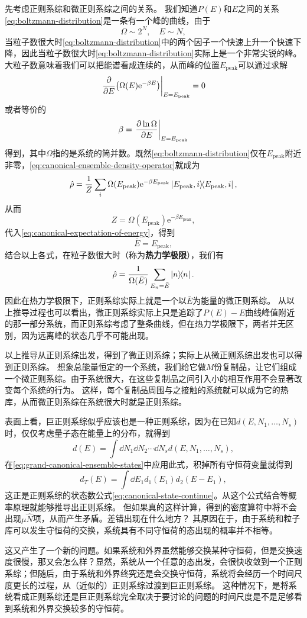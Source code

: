 \documentclass[hyperref, UTF8, a4paper]{ctexart}
\newcommand*{\ee}{\mathrm{e}}
\begin{document}
先考虑正则系综和微正则系综之间的关系。
我们知道$P(E)$和$E$之间的关系\eqref{eq:boltzmann-distribution}是一条有一个峰的曲线，由于
\[
    \Omega \sim 2^N, \quad E \sim N,
\]
当粒子数很大时\eqref{eq:boltzmann-distribution}中的两个因子一个快速上升一个快速下降，因此当粒子数很大时\eqref{eq:boltzmann-distribution}实际上是一个非常尖锐的峰。
大粒子数意味着我们可以把能谱看成连续的，从而峰的位置$E_\text{peak}$可以通过求解
\[
    \eval{\pdv{E} (\Omega(E) \ee^{-\beta E})}_{E=E_\text{peak}} = 0
\]
或者等价的
\[
    \beta = \eval{\pdv{\ln \Omega}{E}}_{E=E_\text{peak}}
\]
得到，其中$\Omega$指的是系统的简并数。既然\eqref{eq:boltzmann-distribution}仅在$E_\text{peak}$附近非零，\eqref{eq:canonical-ensemble-density-operator}就成为
\[
    \hat{\rho} = \frac{1}{Z} \sum_i \Omega(E_\text{peak}) \ee^{-\beta E_\text{peak}} \dyad{E_\text{peak}, i},
\]
从而
\[
    Z = \Omega(E_\text{peak}) \ee^{-\beta E_\text{peak}},
\]
代入\eqref{eq:canonical-expectation-of-energy}，得到
\[
    \bar{E} = E_\text{peak},
\]
结合以上各式，在粒子数很大时（称为\textbf{热力学极限}），我们有
\begin{equation}
    \hat{\rho} = \frac{1}{\Omega(\bar{E})} \sum_{E_n=\bar{E}} \dyad{n}. 
\end{equation}
因此在热力学极限下，正则系综实际上就是一个以$\bar{E}$为能量的微正则系综。
从以上推导过程也可以看出，微正则系综实际上只是追踪了$P(E)-E$曲线峰值附近的那一部分系统，而正则系综考虑了整条曲线，但在热力学极限下，两者并无区别，因为远离峰的状态几乎不可能出现。

以上推导从正则系综出发，得到了微正则系综；实际上从微正则系综出发也可以得到正则系综。
想象总能量恒定的一个系统，我们给它做$M$份复制品，让它们组成一个微正则系综。由于系统很大，在这些复制品之间引入小的相互作用不会显著改变每个系统的行为。
这样，每个复制品周围与之接触的系统就可以成为它的热库，从而微正则系综在系统很大时就是正则系综。

表面上看，巨正则系综似乎应该也是一种正则系综，因为在已知$d(E, N_1, \ldots, N_s)$时，仅仅考虑量子态在能量上的分布，就得到
\[
    d(E) = \int \dd{N_1} \dd{N_2} \cdots \dd{N_s} d(E, N_1, \ldots, N_s),
\]
在\eqref{eq:grand-canonical-ensemble-states}中应用此式，积掉所有守恒荷变量就得到
\[
    d_T(E) = \int \dd{E_1} d_1(E_1) d_2(E-E_1),
\]
这正是正则系综的状态数公式\eqref{eq:canonical-state-continue}。从这个公式结合等概率原理就能够推导出正则系综。
但如果真的这样计算，得到的密度算符中将不会出现$\mu \hat{N}$项，从而产生矛盾。差错出现在什么地方？
其原因在于，由于系统和粒子库可以发生守恒荷的交换，系统具有不同守恒荷的态出现的概率并不相等。

这又产生了一个新的问题。如果系统和外界虽然能够交换某种守恒荷，但是交换速度很慢，那又会怎么样？显然，系统从一个任意的态出发，会很快收敛到一个正则系综；但随后，由于系统和外界终究还是会交换守恒荷，系统将会经历一个时间尺度更长的过程，从（近似的）正则系综过渡到巨正则系综。
这种情况下，是将系统看成正则系综还是巨正则系综完全取决于要讨论的问题的时间尺度是不是足够看到系统和外界交换较多的守恒荷。
\end{document}
